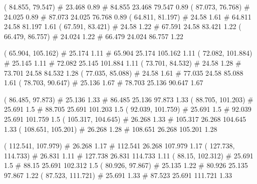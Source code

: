 \documentclass[a4paper,openbib,10pt]{article}
\newenvironment{treegraph}{\begin{graph}}{\end{graph}}
\begin{document}
\begin{treegraph}
  ( 84.855, 79.547) #     23.468    0.89
   #    84.855    23.468    79.547    0.89
  ( 87.073, 76.768) #     24.025    0.89
   #    87.073    24.025    76.768    0.89
  ( 64.811, 81.197) #     24.58    1.61
   #    64.811    24.58    81.197    1.61
  ( 67.591, 83.421) #     24.58    1.22
   #    67.591    24.58    83.421    1.22
  ( 66.479, 86.757) #     24.024    1.22
   #    66.479    24.024    86.757    1.22

  ( 65.904, 105.162) #     25.174    1.11
   #    65.904    25.174    105.162    1.11
  ( 72.082, 101.884) #     25.145    1.11
   #    72.082    25.145    101.884    1.11
  ( 73.701, 84.532) #     24.58    1.28
   #    73.701    24.58    84.532    1.28
  ( 77.035, 85.088) #     24.58    1.61
   #    77.035    24.58    85.088    1.61
  ( 78.703, 90.647) #     25.136    1.67
   #    78.703    25.136    90.647    1.67

  ( 86.485, 97.873) #     25.136    1.33
   #    86.485    25.136    97.873    1.33
  ( 88.705, 101.203) #     25.691    1.5
   #    88.705    25.691    101.203    1.5
  ( 92.039, 101.759) #     25.691    1.5
   #    92.039    25.691    101.759    1.5
  ( 105.317, 104.645) #     26.268    1.33
   #    105.317    26.268    104.645    1.33
  ( 108.651, 105.201) #     26.268    1.28
   #    108.651    26.268    105.201    1.28

  ( 112.541, 107.979) #     26.268    1.17
   #    112.541    26.268    107.979    1.17
  ( 127.738, 114.733) #     26.831    1.11
   #    127.738    26.831    114.733    1.11
  ( 88.15, 102.312) #     25.691    1.5
   #    88.15    25.691    102.312    1.5
  ( 80.926, 97.867) #     25.135    1.22
   #    80.926    25.135    97.867    1.22
  ( 87.523, 111.721) #     25.691    1.33
   #    87.523    25.691    111.721    1.33


\end{treegraph}
\end{document}
